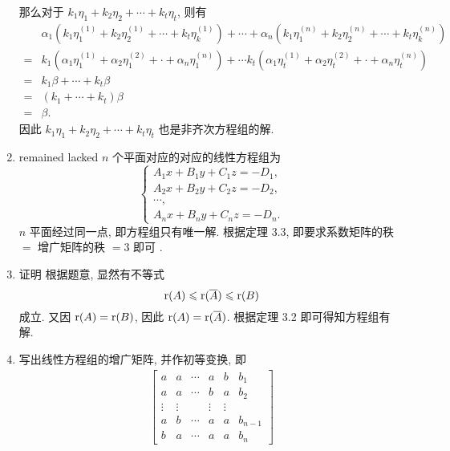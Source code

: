 \begin{enumerate}
        那么对于 $k_1\eta_1 + k_2\eta_2 + \cdots + k_t\eta_t$, 则有
        \begin{align*}
            & \alpha_1(k_1\eta_1^{(1)} + k_2\eta_2^{(1)} + \cdots + k_t\eta_k^{(1)}) + \cdots + \alpha_n(k_1\eta_1^{(n)} + k_2\eta_2^{(n)} + \cdots + k_t\eta_k^{(n)}) \\
            ={} & k_1(\alpha_1\eta_1^{(1)} + \alpha_2\eta_1^{(2)} + \cdot + \alpha_n\eta_1^{(n)}) + \cdots k_t(\alpha_1\eta_t^{(1)} + \alpha_2\eta_t^{(2)} + \cdot + \alpha_n\eta_t^{(n)}) \\
            ={} & k_1\beta + \cdots + k_t\beta \\
            ={} & (k_1 + \cdots + k_t)\beta \\
            ={} & \beta.
        \end{align*}
        因此 $k_1\eta_1 + k_2\eta_2 + \cdots + k_t\eta_t$ 也是非齐次方程组的解.
    \item %
        {\color{red} remained lacked}
        $n$ 个平面对应的对应的线性方程组为
        \[
            \begin{cases}
                A_1x + B_1y + C_1z = -D_1, \\
                A_2x + B_2y + C_2z = -D_2, \\
                \cdots, \\
                A_nx + B_ny + C_nz = -D_n.
            \end{cases}
        \]
        $n$ 平面经过同一点, 即方程组只有唯一解. 根据定理 3.3, 即要求系数矩阵的秩 $=$ 增广矩阵的秩 $= 3$ 即可 .
    \item %
        {\heiti 证明} 根据题意, 显然有不等式
        \[
            \mathrm{r}(A) \leqslant \mathrm{r}(\overline{A}) \leqslant \mathrm{r}(B)    
        \]
        成立. 又因 $\mathrm{r}(A) = \mathrm{r}(B)$, 因此 $\mathrm{r}(A) = \mathrm{r}(\overline{A})$. 根据定理 3.2 即可得知方程组有解.
    \item %
        写出线性方程组的增广矩阵, 并作初等变换, 即
        \begin{gather*}
            \begin{bmatrix}
                a & a & \cdots & a & b & b_1 \\
                a & a & \cdots & b & a & b_2 \\
                \vdots & \vdots &  & \vdots & \vdots \\
                a & b & \cdots & a & a & b_{n-1} \\
                b & a & \cdots & a & a & b_n
            \end{bmatrix}

\end{gather*}
\end{enumerate}
